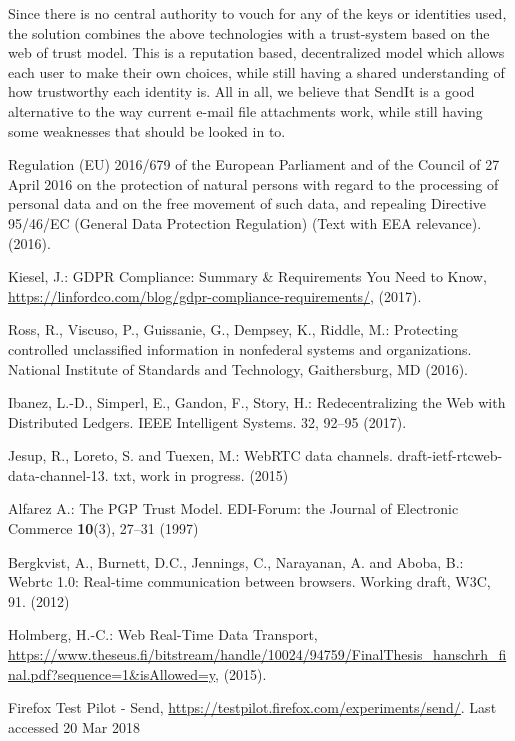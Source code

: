 \documentclass[runningheads]{llncs}
\begin{document}
Since there is no central authority to vouch for any of the keys or identities used, the solution combines the above technologies with a trust-system based on the web of trust model. This is a reputation based, decentralized model which allows each user to make their own choices, while still having a shared understanding of how trustworthy each identity is. All in all, we believe that SendIt is a good alternative to the way current e-mail file attachments work, while still having some weaknesses that should be looked in to.\\
%
\begin{thebibliography}{8}
Regulation (EU) 2016/679 of the European Parliament and of the Council of 27 April 2016 on the protection of natural persons with regard to the processing of personal data and on the free movement of such data, and repealing Directive 95/46/EC (General Data Protection Regulation) (Text with EEA relevance). (2016).

Kiesel, J.: GDPR Compliance: Summary \& Requirements You Need to Know, \url{https://linfordco.com/blog/gdpr-compliance-requirements/}, (2017).

Ross, R., Viscuso, P., Guissanie, G., Dempsey, K., Riddle, M.: Protecting controlled unclassified information in nonfederal systems and organizations. National Institute of Standards and Technology, Gaithersburg, MD (2016).

Ibanez, L.-D., Simperl, E., Gandon, F., Story, H.: Redecentralizing the Web with Distributed Ledgers. IEEE Intelligent Systems. 32, 92–95 (2017).

Jesup, R., Loreto, S. and Tuexen, M.: WebRTC data channels. draft-ietf-rtcweb-data-channel-13. txt, work in progress. (2015)

Alfarez A.: The PGP Trust Model. EDI-Forum: the Journal of Electronic Commerce \textbf{10}(3), 27--31 (1997)

Bergkvist, A., Burnett, D.C., Jennings, C., Narayanan, A. and Aboba, B.: Webrtc 1.0: Real-time communication between browsers. Working draft, W3C, 91. (2012)

Holmberg, H.-C.: Web Real-Time Data Transport, \url{https://www.theseus.fi/bitstream/handle/10024/94759/FinalThesis\_hanschrh\_final.pdf?sequence=1\&isAllowed=y}, (2015).

Firefox Test Pilot - Send, \url{https://testpilot.firefox.com/experiments/send/}. Last accessed 20 Mar 2018


\end{thebibliography}
\end{document}
